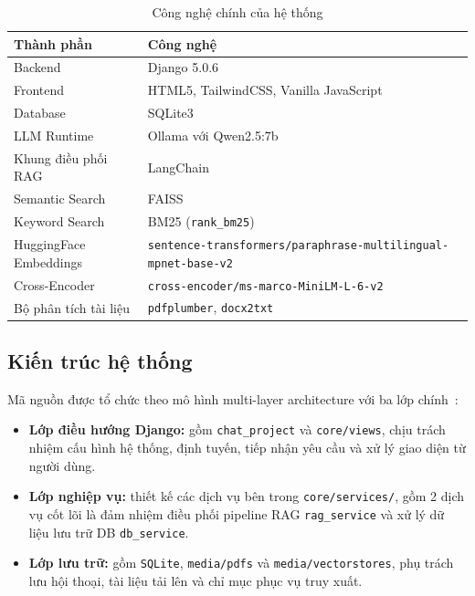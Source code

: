 \documentclass[10pt, conference, a4paper, compsocconf]{IEEEtran}
\begin{document}
\begin{table}[H]
  \renewcommand{\arraystretch}{1.15}
  \caption{Công nghệ chính của hệ thống}
  \label{tab:stack}
  \centering
  \scriptsize
  \begin{tabular}{|p{}|p{}|}
    \hline
    \textbf{Thành phần} & \textbf{Công nghệ} \\
    \hline
    Backend & Django 5.0.6 \\
    \hline
    Frontend & HTML5, TailwindCSS, Vanilla JavaScript \\
    \hline
    Database & SQLite3 \\
    \hline
    LLM Runtime & Ollama với Qwen2.5:7b \\
    \hline
    Khung điều phối RAG & LangChain \\
    \hline
    Semantic Search & FAISS \\
    \hline
    Keyword Search & BM25 (\texttt{rank\_bm25}) \\
    \hline
    HuggingFace Embeddings & \texttt{sentence-transformers/paraphrase-multilingual-mpnet-base-v2} \\
    \hline
    Cross-Encoder & \texttt{cross-encoder/ms-marco-MiniLM-L-6-v2} \\
    \hline
    Bộ phân tích tài liệu & \texttt{pdfplumber}, \texttt{docx2txt} \\
    \hline
  \end{tabular}
\end{table}

\subsection{Kiến trúc hệ thống}

Mã nguồn được tổ chức theo mô hình multi-layer architecture với ba lớp chính~\cite{smartdoc-source}:

\begin{itemize}
  \item \textbf{Lớp điều hướng Django:} gồm \texttt{chat\_project} và \texttt{core/views}, chịu trách nhiệm cấu hình hệ thống, định tuyến, tiếp nhận yêu cầu và xử lý giao diện từ người dùng.
  \item \textbf{Lớp nghiệp vụ:} thiết kế các dịch vụ bên trong \texttt{core/services/}, gồm 2 dịch vụ cốt lõi là đảm nhiệm điều phối pipeline RAG \texttt{rag\_service} và xử lý dữ liệu lưu trữ DB \texttt{db\_service}.
  \item \textbf{Lớp lưu trữ:} gồm \texttt{SQLite}, \texttt{media/pdfs} và \texttt{media/vectorstores}, phụ trách lưu hội thoại, tài liệu tải lên và chỉ mục phục vụ truy xuất.
\end{itemize}
\end{document}
